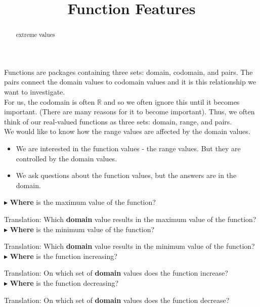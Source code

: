 \documentclass{ximera}
\title{Function Features}
\begin{document}
\begin{abstract}
extreme values
\end{abstract}
\maketitle





Functions are packages containing three sets: domain, codomain, and pairs.  The pairs connect the domain values to codomain values and it is this relationship we want to investigate.   \\


For us, the codomain is often $\mathbb{R}$ and so we often ignore this until it becomes important.  (There are many reasons for it to become important).  Thus, we often think of our real-valued functions as three sets: domain, range, and pairs. \\


We would like to know how the range values are affected by the domain values. \\


\begin{itemize}
\item We are interested in the function values - the range values.  But they are controlled by the domain values. \\
\item We ask questions about the function values, but the answers are in the domain.
\end{itemize}




\begin{idea}


$\blacktriangleright$ \textbf{\textcolor{purple!85!blue}{Where}} is the maximum value of the function? 

Translation: Which \textbf{\textcolor{purple!85!blue}{domain}} value results in the maximum value of the function? \\


$\blacktriangleright$ \textbf{\textcolor{purple!85!blue}{Where}} is the minimum value of the function? 

Translation: Which \textbf{\textcolor{purple!85!blue}{domain}} value results in the minimum value of the function? \\


$\blacktriangleright$ \textbf{\textcolor{purple!85!blue}{Where}} is the function increasing? 

Translation: On which set of \textbf{\textcolor{purple!85!blue}{domain}} values does the function increase? \\


$\blacktriangleright$ \textbf{\textcolor{purple!85!blue}{Where}} is the function decreasing? 

Translation: On which set of \textbf{\textcolor{purple!85!blue}{domain}} values does the function decrease? \\


\end{idea}
\end{document}
